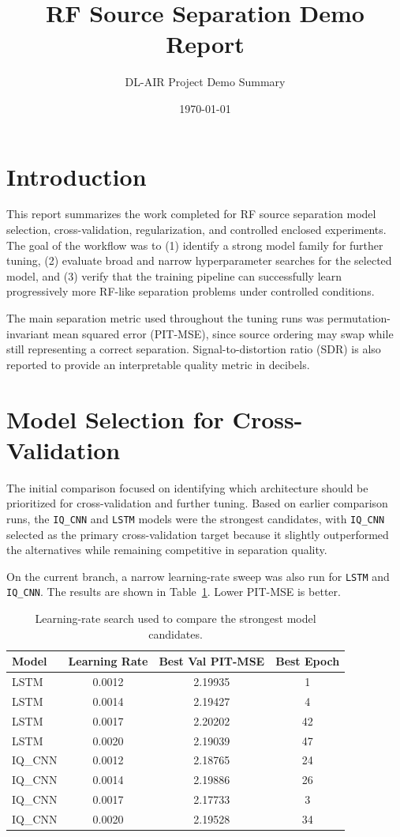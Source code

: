 \documentclass[11pt]{article}
\title{RF Source Separation Demo Report}
\author{DL-AIR Project Demo Summary}
\date{\today}
\begin{document}
\maketitle

\section{Introduction}
This report summarizes the work completed for RF source separation model selection, cross-validation, regularization, and controlled enclosed experiments. The goal of the workflow was to (1) identify a strong model family for further tuning, (2) evaluate broad and narrow hyperparameter searches for the selected model, and (3) verify that the training pipeline can successfully learn progressively more RF-like separation problems under controlled conditions.

The main separation metric used throughout the tuning runs was permutation-invariant mean squared error (PIT-MSE), since source ordering may swap while still representing a correct separation. Signal-to-distortion ratio (SDR) is also reported to provide an interpretable quality metric in decibels.

\section{Model Selection for Cross-Validation}
The initial comparison focused on identifying which architecture should be prioritized for cross-validation and further tuning. Based on earlier comparison runs, the \texttt{IQ\_CNN} and \texttt{LSTM} models were the strongest candidates, with \texttt{IQ\_CNN} selected as the primary cross-validation target because it slightly outperformed the alternatives while remaining competitive in separation quality.

On the current branch, a narrow learning-rate sweep was also run for \texttt{LSTM} and \texttt{IQ\_CNN}. The results are shown in Table~\ref{tab:lrsearch}. Lower PIT-MSE is better.

\begin{table}[htbp]
\centering
\caption{Learning-rate search used to compare the strongest model candidates.}
\label{tab:lrsearch}
\begin{tabular}{lccc}
\hline
Model & Learning Rate & Best Val PIT-MSE & Best Epoch \\
\hline
LSTM & 0.0012 & 2.19935 & 1 \\
LSTM & 0.0014 & 2.19427 & 4 \\
LSTM & 0.0017 & 2.20202 & 42 \\
LSTM & 0.0020 & 2.19039 & 47 \\
\hline
IQ\_CNN & 0.0012 & 2.18765 & 24 \\
IQ\_CNN & 0.0014 & 2.19886 & 26 \\
IQ\_CNN & 0.0017 & 2.17733 & 3 \\
IQ\_CNN & 0.0020 & 2.19528 & 34 \\
\hline
\end{tabular}
\end{table}
\end{document}
